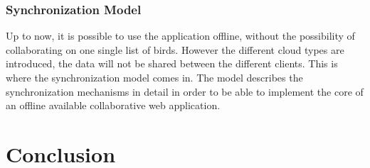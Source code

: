 \documentclass[a4paper,12pt]{report}
\begin{document}
\subsection{Synchronization Model}\label{subsec:SynchronizationModel}

Up to now, it is possible to use the application offline, without the possibility of collaborating on one single list of birds. However the different cloud types are introduced, the data will not be shared between the different clients. This is where the synchronization model comes in. The model describes the synchronization mechanisms in detail in order to be able to implement the core of an offline available collaborative web application.

\chapter{Conclusion}\label{cha:Conclusion} %
\end{document}
